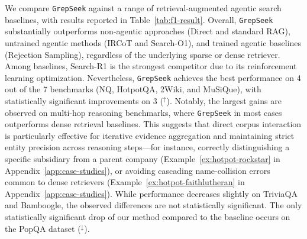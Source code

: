 \documentclass{article} %
\newcommand{\ourmethod}{\texttt{GrepSeek}\xspace}
\begin{document}
We compare \ourmethod{} against a range of retrieval-augmented agentic search baselines, with results reported in Table~\ref{tab:f1-result}. Overall, \ourmethod{} substantially outperforms non-agentic approaches (Direct and standard RAG), untrained agentic methods (IRCoT and Search-O1), and trained agentic baselines (Rejection Sampling), regardless of the underlying sparse or dense retriever. Among baselines, Search-R1 is the strongest competitor due to its reinforcement learning optimization. Nevertheless, \ourmethod{} achieves the best performance on 4 out of the 7 benchmarks (NQ, HotpotQA, 2Wiki, and MuSiQue), with statistically significant improvements on 3 ($^\uparrow$). Notably, the largest gains are observed on multi-hop reasoning benchmarks, where \ourmethod{} in most cases outperforms dense retrieval baselines. This suggests that direct corpus interaction is particularly effective for iterative evidence aggregation and maintaining strict entity precision across reasoning steps---for instance, correctly distinguishing a specific subsidiary from a parent company (Example~\ref{ex:hotpot-rockstar} in Appendix~\ref{app:case-studies}), or avoiding cascading name-collision errors common to dense retrievers (Example~\ref{ex:hotpot-faithlutheran} in Appendix~\ref{app:case-studies}). While performance decreases slightly on TriviaQA and Bamboogle, the observed differences are not statistically significant. The only statistically significant drop of our method compared to the baseline occurs on the PopQA dataset ($^\downarrow$).
\end{document}
